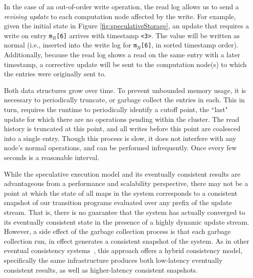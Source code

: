 In the case of an out-of-order write operation, the read log allows us to send a
\textit{revising update} to each computation node affected by the write.
For example, given the initial state in Figure \ref{fig:speculativeStorage}, an
update that requires a write on entry \texttt{m$_R$[6]} arrives with timestamp
\texttt{<3>}.  The value will be written as normal (i.e., inserted into the
write log for \texttt{m$_R$[6]}, in sorted timestamp order).  Additionally,
because the read log shows a read on the same entry with a later timestamp, a
corrective update will be sent to the computation node(s) to which the entries
were originally sent to.

Both data structures grow over time.  To prevent unbounded memory usage,
it is necessary to periodically truncate, or garbage collect the entries in each. 
This in turn, requires the runtime to periodically identify a cutoff point, the
``last" update for which there are no operations pending within the cluster. 
The read history is truncated at this point, and all writes before this point
are coalesced into a single entry.  Though this process is slow, it does not
interfere with any node's normal operations, and can be performed infrequently.
Once every few seconds is a reasonable interval.

While the speculative execution model and its eventually consistent results are
advantageous from a performance and scalability perspective, there may not be a
point at which the state of all maps in the system corresponds to a consistent
snapshot of our transition programs evaluated over any prefix of the update
stream.
That is, there is no guarantee that the system has actually converged to its
eventually consistent state in the presence of a highly dynamic update stream.
However, a side effect of the garbage collection process is that each garbage
collection run, in effect generates a consistent snapshot of the system. As in
other eventual consistency systems~\cite{bayou}, this approach offers a hybrid
consistency model, specifically the same infrastructure produces both
low-latency eventually consistent results, as well as higher-latency consistent
snapshots.

